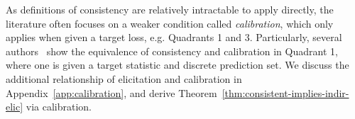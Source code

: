 \documentclass[11pt]{article} %
\begin{document}
As definitions of consistency are relatively intractable to apply directly, the literature often focuses on a weaker condition called \emph{calibration}, which only applies when given a target loss, e.g. Quadrants 1 and 3. 
Particularly, several authors~\citep{zhang2004statistical, lin2004note,bartlett2006convexity,tewari2007consistency,ramaswamy2016convex} show the equivalence of consistency and calibration in Quadrant 1, where one is given a target statistic and discrete prediction set.
We discuss the additional relationship of elicitation and calibration in Appendix~\ref{app:calibration}, and derive Theorem~\ref{thm:consistent-implies-indir-elic} via calibration.


\end{document}
